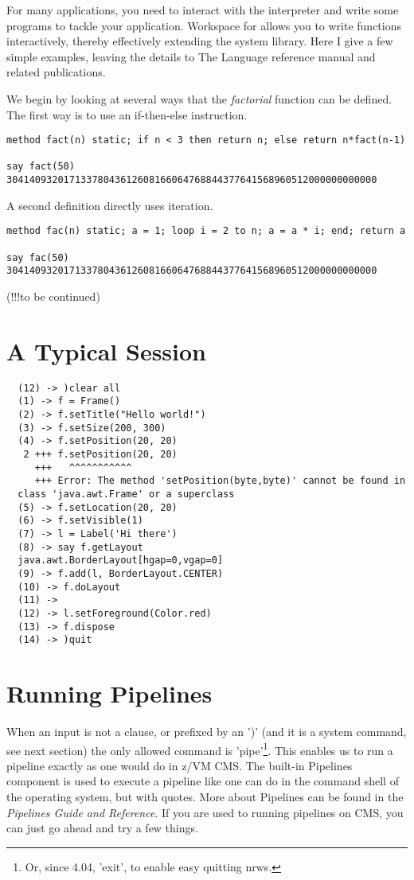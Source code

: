 For many applications, you need to interact with the interpreter and write some \nr{} programs to tackle your application. Workspace for \nr{} allows you to write functions interactively, thereby effectively extending the system library. Here I give a few simple examples, leaving the details to The \nr{} Language reference manual and related publications.

We begin by looking at several ways that the \emph{factorial} function can
be defined. The first way is to use an if-then-else instruction.
\begin{verbatim}
method fact(n) static; if n < 3 then return n; else return n*fact(n-1)

say fact(50)
30414093201713378043612608166064768844377641568960512000000000000
\end{verbatim}
A second definition directly uses iteration.
\begin{verbatim}
method fac(n) static; a = 1; loop i = 2 to n; a = a * i; end; return a

say fac(50)
30414093201713378043612608166064768844377641568960512000000000000
\end{verbatim}
(!!!to be continued)

 \section{A Typical Session}
\begin{verbatim}
  (12) -> )clear all
  (1) -> f = Frame()
  (2) -> f.setTitle("Hello world!")
  (3) -> f.setSize(200, 300)
  (4) -> f.setPosition(20, 20)
   2 +++ f.setPosition(20, 20)
     +++   ^^^^^^^^^^^
     +++ Error: The method 'setPosition(byte,byte)' cannot be found in
  class 'java.awt.Frame' or a superclass
  (5) -> f.setLocation(20, 20)
  (6) -> f.setVisible(1)
  (7) -> l = Label('Hi there')
  (8) -> say f.getLayout
  java.awt.BorderLayout[hgap=0,vgap=0]
  (9) -> f.add(l, BorderLayout.CENTER)
  (10) -> f.doLayout
  (11) ->
  (12) -> l.setForeground(Color.red)
  (13) -> f.dispose
  (14) -> )quit
\end{verbatim}

 \section{Running Pipelines}
 When an input is not a \nr{} clause, or prefixed by an ')' (and it is a system command,
 see next section) the only allowed command is 'pipe'\footnote{Or,
   since \nr{} 4.04, 'exit', to enable easy quitting nrws.}. This enables us
 to run a pipeline exactly as one would do in z/VM CMS. The built-in
 \nr{} Pipelines component is used to execute a pipeline like one
 can do in the command shell of the operating system, but with
 quotes. More about Pipelines can be found in the \emph{Pipelines Guide and
 Reference}. If you are used to running pipelines on CMS, you can just go ahead and try a few things.

